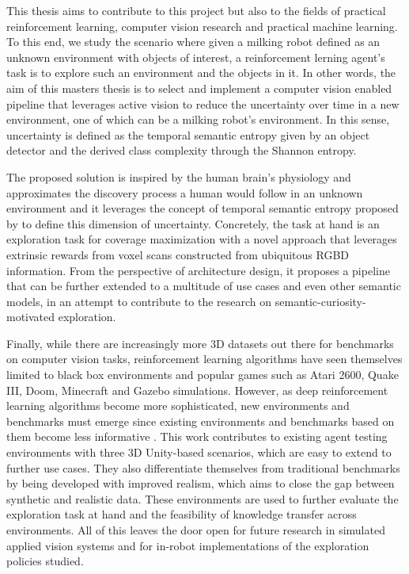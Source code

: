 This thesis aims to contribute to this project but also to the fields of practical reinforcement learning, computer vision research and practical machine learning. To this end, we study the scenario where given a milking robot defined as an unknown environment with objects of interest, a reinforcement lerning agent's task is to explore such an environment and the objects in it.
In other words, the aim of this masters thesis is to select and implement a computer vision enabled pipeline that leverages active vision to reduce the uncertainty over time in a new environment, one of which can be a milking robot's environment. In this sense, uncertainty is defined as the temporal semantic entropy given by an object detector and the derived class complexity through the Shannon entropy. 

The proposed solution is inspired by the human brain's physiology and approximates the discovery process a human would follow in an unknown environment and it leverages the concept of temporal semantic entropy proposed by \textcite{chaplot2020semantic} to define this dimension of uncertainty. Concretely, the task at hand is an exploration task for coverage maximization with a novel approach that leverages extrinsic rewards from voxel scans constructed from ubiquitous RGBD information. From the perspective of architecture design, it proposes a pipeline that can be further extended to a multitude of use cases and even other semantic models, in an attempt to contribute to the research on semantic-curiosity-motivated exploration.

Finally, while there are increasingly more 3D datasets out there for benchmarks on computer vision tasks, reinforcement learning algorithms have seen themselves limited to black box environments and popular games such as Atari 2600, Quake III, Doom, Minecraft and Gazebo simulations. However, as deep reinforcement learning algorithms become more sophisticated, new environments and benchmarks must emerge since existing environments and benchmarks based on them become less informative \cite{juliani2018unity}. This work contributes to existing agent testing environments with three 3D Unity-based scenarios, which are easy to extend to further use cases. They also differentiate themselves from traditional benchmarks by being developed with improved realism, which aims to close the gap between synthetic and realistic data. These environments are used to further evaluate the exploration task at hand and the feasibility of knowledge transfer across environments. All of this leaves the door open for future research in simulated applied vision systems and for in-robot implementations of the exploration policies studied.

